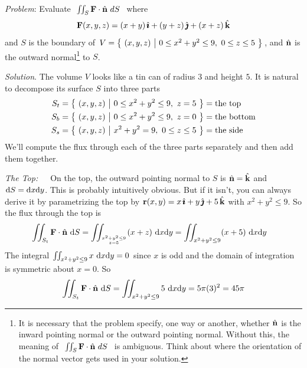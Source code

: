 \begin{eg}\label{eg:fluxIntegralC}
\noindent\textit{Problem}: Evaluate
$\ \dblInt_S\vF\cdot\hn\ dS\ $ where
\begin{equation*}
\mathbf{F}(x,y,z) = (x+y)\,\hat{\pmb{\imath}} + (y+z)\,\hat{\pmb{\jmath}} + (x+z)\,\hat{\mathbf{k}}
\end{equation*}
and $S$ is the boundary of $V=\big\{ \ (x,y,z)\ \big|\ 0\le x^2+y^2\le 9,\ 0\le z\le 5\ \big\}$,
and $\hat{\mathbf{n}}$ is the outward normal\footnote{It is necessary that the problem specify, one way or another, whether $\hat{\mathbf{n}}$ is the inward pointing normal or the outward pointing normal. Without this, the meaning of 
$\ \dblInt_S\vF\cdot\hn\ dS\ $ is ambiguous. Think about where the orientation of the normal vector gets used in your solution.} to $S$. 

\medskip
\noindent\textit{Solution}.
The volume $V$ looks like a tin can of radius $3$ and height $5$.
It is natural to decompose its surface $S$ into three parts
\begin{align*}
S_t &= \big\{ \ (x,y,z)\ \big|\ 0\le x^2+y^2\le 9,\  z= 5\ \big\} = \text{the top} \\
S_b &= \big\{ \ (x,y,z)\ \big|\ 0\le x^2+y^2\le 9,\  z= 0\ \big\} = \text{the bottom} \\
S_s &= \big\{ \ (x,y,z)\ \big|\ x^2+y^2 = 9,\  0\le z\le 5\ \big\} = \text{the side} 
\end{align*}
We'll compute the flux through each of the three parts separately and 
then add them together.

\noindent\emph{The Top:}\ \ \ On the top, the outward pointing normal to
$S$ is $\hat{\mathbf{n}}=\hat{\mathbf{k}}$ and $\mathrm{d}S = \mathrm{d}x\mathrm{d}y$. This is probably
intuitively obvious. But if it isn't, you can always derive it by parametrizing
the top by $\mathbf{r}(x,y) = x\,\hat{\pmb{\imath}} +y\,\hat{\pmb{\jmath}} + 5\,\hat{\mathbf{k}}$ with $x^2+y^2\le 9$.
So the flux through the top is
\begin{align*}
\dblInt_{S_t}\vF\cdot\hn\ \dee{S}
&= \dblInt_{\atp{x^2+y^2\le 9}{z=5}} (x+z)\ \dee{x}\dee{y}
= \dblInt_{x^2+y^2\le 9} (x+5)\ \dee{x}\dee{y}
\end{align*}
The integral $\iint_{x^2+y^2\le 9} x\ \mathrm{d}x\mathrm{d}y=0$ since $x$
is odd and the domain of integration is symmetric about $x=0$.
So 
\begin{align*}
\iint_{S_t}\mathbf{F}\cdot\hat{\mathbf{n}}\ \mathrm{d}S
= \iint_{x^2+y^2\le 9} 5\ \mathrm{d}x\mathrm{d}y
=5\pi(3)^2
=45\pi
\end{align*}



\end{eg}
